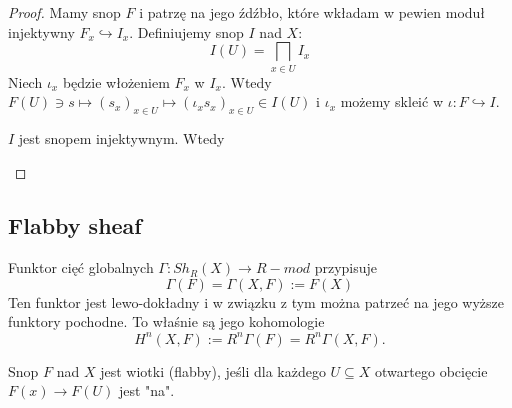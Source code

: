 \begin{proof}
  Mamy snop $F$ i patrzę na jego źdźbło, które wkładam w pewien moduł injektywny $F_x\hookrightarrow I_x$. Definiujemy snop $I$ nad $X$:
  $$I(U)=\bigsqcap_{x\in U}I_x$$
  Niech $\iota_x$ będzie włożeniem $F_x$ w $I_x$. Wtedy $F(U)\ni s\mapsto (s_x)_{x\in U}\mapsto (\iota_x s_x)_{x\in U}\in I(U)$ i $\iota_x$ możemy skleić w $\iota:F\hookrightarrow I$.

  $I$ jest snopem injektywnym. Wtedy 
  \begin{center}\end{center}

  \begin{center}\end{center}

  \begin{center}\end{center}
\end{proof}

\subsection{Flabby sheaf}

\begin{definition} 
  Funktor cięć globalnych $\Gamma:Sh_R(X)\to R-mod$ przypisuje
  $$\Gamma(F)=\Gamma(X, F):=F(X)$$
  Ten funktor jest lewo-dokładny i w związku z tym można patrzeć na jego wyższe funktory pochodne. To właśnie są jego kohomologie
  $$H^n(X, F):=R^n\Gamma(F)=R^n\Gamma(X, F).$$
\end{definition}

\begin{definition}
  Snop $F$ nad $X$ jest wiotki (flabby), jeśli dla każdego $U\subseteq X$ otwartego obcięcie $F(x)\to F(U)$ jest "na".
\end{definition}

